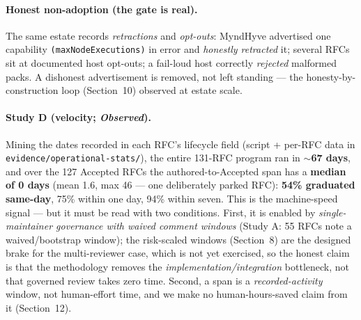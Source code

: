 \documentclass[11pt]{article}
\begin{document}
\paragraph{Honest non-adoption (the gate is real).} The same estate records \emph{retractions} and
\emph{opt-outs}: MyndHyve advertised one capability \texttt{(maxNodeExecutions)} in error and
\emph{honestly retracted} it; several RFCs sit at documented host opt-outs; a fail-loud host correctly
\emph{rejected} malformed packs. A dishonest advertisement is removed, not left standing --- the
honesty-by-construction loop (Section~10) observed at estate scale.

\paragraph{Study D (velocity; \emph{Observed}).} Mining the dates recorded in each RFC's
lifecycle field (script + per-RFC data in \texttt{evidence/operational-stats/}), the entire
131-RFC program ran in \textbf{$\sim$67 days}, and over the 127 Accepted RFCs the authored-to-Accepted
span has a \textbf{median of 0 days} (mean 1.6, max 46 --- one deliberately parked RFC): \textbf{54\%
graduated same-day}, 75\% within one day, 94\% within seven. This is the machine-speed signal --- but
it must be read with two
conditions. First, it is enabled by \emph{single-maintainer governance with waived comment windows}
(Study A: 55 RFCs note a waived/bootstrap window); the risk-scaled windows (Section~8) are the designed
brake for the multi-reviewer case, which is not yet exercised, so the honest claim is that the
methodology removes the \emph{implementation/integration} bottleneck, not that governed review takes
zero time. Second, a span is a \emph{recorded-activity} window, not human-effort time, and we make no
human-hours-saved claim from it (Section~12).
\end{document}
